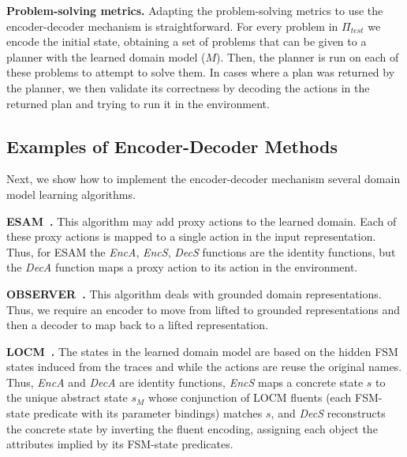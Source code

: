 \documentclass{article}
\newcommand{\miniparagraph}[1]{\textbf{#1.}}
\theoremstyle{definition}
\theoremstyle{remark}
\newcommand{\ptest}{\ensuremath{\Pi_{\textit{test}}}\xspace}
\newcommand{\encodea}{\textit{EncA}\xspace}
\newcommand{\encodes}{\textit{EncS}\xspace}
\newcommand{\decodea}{\textit{DecA}\xspace}
\newcommand{\decodes}{\textit{DecS}\xspace}
\newif\ifaddcomments
\newcommand{\roni}[1]{\ifaddcomments{\textcolor{red}{[Roni: #1]}}\fi}
\begin{document}
\roni{Would be great if someone would add an example of this.}

\miniparagraph{Problem-solving metrics} 
Adapting the problem-solving metrics to use the encoder-decoder mechanism is straightforward. 
For every problem in \ptest we encode the initial state, obtaining a set of problems that can be given to a planner with the learned domain model ($M$). 
Then, the planner is run on each of these problems to attempt to solve them.
In cases where a plan was returned by the planner, we then validate its correctness by decoding the actions in the returned plan and trying to run it in the environment. 






\subsection{Examples of Encoder-Decoder Methods}
Next, we show how to implement the encoder-decoder mechanism several domain model learning algorithms. 

\miniparagraph{ESAM~\citep{juba2021safe}}
This algorithm may add proxy actions to the learned domain. 
Each of these proxy actions is mapped to a single action in the input representation. 
Thus, for ESAM the \encodea, \encodes, \decodes functions are the identity functions, but the \decodea function maps a proxy action to its action in the environment. 

\miniparagraph{OBSERVER~\citep{wang1996learning}}
This algorithm deals with grounded domain representations. 
Thus, we require an encoder to move from lifted to grounded representations and then a decoder to map back to a lifted representation.

\miniparagraph{LOCM~\citep{cresswell2013acquiring}} 
The states in the learned domain model are based on the hidden FSM states induced from the traces and while the actions are reuse the original names. Thus, \encodea and \decodea are identity functions, \encodes maps a concrete state $s$ to the unique abstract state $s_M$ whose conjunction of LOCM fluents (each FSM-state predicate with its parameter bindings) matches $s$, and \decodes reconstructs the concrete state by inverting the fluent encoding, assigning each object the attributes implied by its FSM-state predicates.
\end{document}
